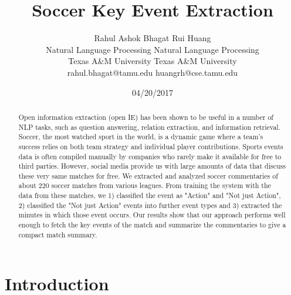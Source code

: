 \documentclass[11pt,letterpaper]{article}
\title{Soccer Key Event Extraction}
\author{Rahul Ashok Bhagat \qquad \qquad  \qquad Rui Huang \\
         Natural Language Processing \qquad  Natural Language Processing \\Texas A\&M University \qquad Texas A\&M University\\ rahul.bhagat@tamu.edu \qquad huangrh@cse.tamu.edu}
\date{04/20/2017}
\begin{document}
\maketitle

\begin{abstract}
  Open information extraction (open IE) has been shown to be useful in a number of NLP tasks, such as question answering, relation extraction, and information retrieval. Soccer, the most watched sport in the world, is a dynamic game where a team’s success relies on both team strategy and individual player contributions.  Sports events data is often compiled manually by companies who rarely make it available for free to third parties. However, social media provide us with large amounts of data that discuss these very same matches for free. We extracted and analyzed soccer commentaries of about 220 soccer matches from various leagues. From training the system with the data from these matches, we 1) classified the event as "Action" and "Not just Action", 2) classified the "Not just Action" events into further event types and 3) extracted the minutes in which those event occurs. Our results show that our approach performs well enough to fetch the key events of the match and summarize the commentaries to give a compact match summary.
\end{abstract}


\section{Introduction}
\end{document}
